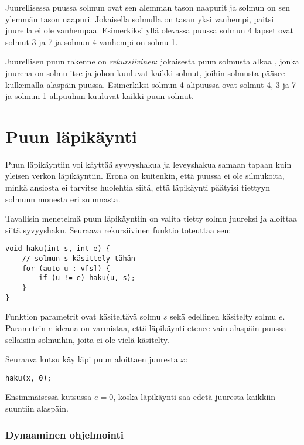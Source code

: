 
Juurellisessa puussa solmun 
ovat sen alemman tason naapurit
ja solmun 
on sen ylemmän tason naapuri.
Jokaisella solmulla on tasan yksi vanhempi,
paitsi juurella ei ole vanhempaa.
Esimerkiksi yllä olevassa puussa solmun 4
lapset ovat solmut 3 ja 7 ja solmun 4 vanhempi on solmu 1.


Juurellisen puun rakenne on \emph{rekursiivinen}:
jokaisesta puun solmusta alkaa ,
jonka juurena on solmu itse ja johon kuuluvat
kaikki solmut, joihin solmusta pääsee kulkemalla alaspäin puussa.
Esimerkiksi solmun 4 alipuussa
ovat solmut 4, 3 ja 7
ja solmun 1 alipuuhun kuuluvat kaikki puun solmut.

\section{Puun läpikäynti}

Puun läpikäyntiin voi käyttää syvyyshakua ja
leveyshakua samaan
tapaan kuin yleisen verkon läpikäyntiin.
Erona on kuitenkin, että puussa ei ole silmukoita,
minkä ansiosta ei tarvitse huolehtia siitä,
että läpikäynti päätyisi tiettyyn
solmuun monesta eri suunnasta.

Tavallisin menetelmä puun läpikäyntiin on
valita tietty solmu juureksi ja aloittaa
siitä syvyyshaku.
Seuraava rekursiivinen funktio toteuttaa sen:

\begin{lstlisting}
void haku(int s, int e) {
    // solmun s käsittely tähän
    for (auto u : v[s]) {
        if (u != e) haku(u, s);
    }
}
\end{lstlisting}

Funktion parametrit ovat käsiteltävä solmu $s$
sekä edellinen käsitelty solmu $e$.
Parametrin $e$ ideana on varmistaa, että
läpikäynti etenee vain alaspäin puussa
sellaisiin solmuihin, joita ei ole vielä käsitelty.

Seuraava kutsu käy läpi puun aloittaen juuresta $x$:

\begin{lstlisting}
haku(x, 0);
\end{lstlisting}

Ensimmäisessä kutsussa $e=0$, koska läpikäynti
saa edetä juuresta kaikkiin suuntiin alaspäin.

\subsubsection{Dynaaminen ohjelmointi}

